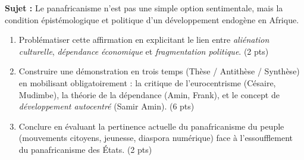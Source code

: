 \documentclass[11pt]{article}
\begin{document}
\begin{exercice}
\textbf{Sujet :} \og Le panafricanisme n'est pas une simple option sentimentale, mais la condition épistémologique et politique d'un développement endogène en Afrique.\fg
\begin{enumerate}
    \item Problématiser cette affirmation en explicitant le lien entre \textit{aliénation culturelle}, \textit{dépendance économique} et \textit{fragmentation politique}. (2 pts)
    \item Construire une démonstration en trois temps (Thèse / Antithèse / Synthèse) en mobilisant obligatoirement : la critique de l'eurocentrisme (Césaire, Mudimbe), la théorie de la dépendance (Amin, Frank), et le concept de \textit{développement autocentré} (Samir Amin). (6 pts)
    \item Conclure en évaluant la pertinence actuelle du \og panafricanisme du peuple\fg{} (mouvements citoyens, jeunesse, diaspora numérique) face à l'essoufflement du \og panafricanisme des États\fg. (2 pts)
\end{enumerate}
\end{exercice}
\end{document}
